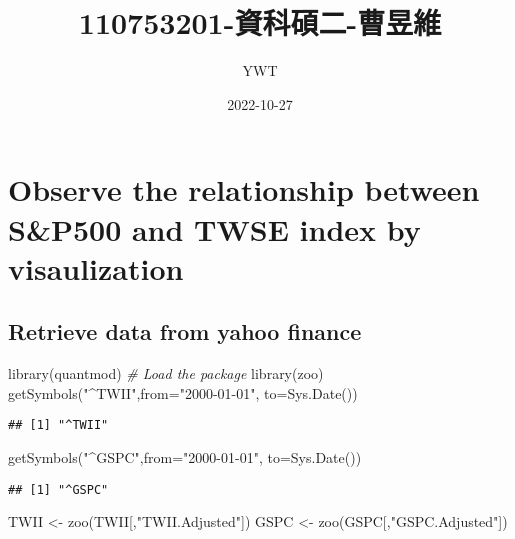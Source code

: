 \documentclass[
]{article}
\title{110753201-資科碩二-曹昱維}
\author{YWT}
\date{2022-10-27}
\newenvironment{Shaded}{\begin{snugshade}}{\end{snugshade}}
\newcommand{\AttributeTok}[1]{\textcolor[rgb]{0.77,0.63,0.00}{#1}}
\newcommand{\CommentTok}[1]{\textcolor[rgb]{0.56,0.35,0.01}{\textit{#1}}}
\newcommand{\FunctionTok}[1]{\textcolor[rgb]{0.00,0.00,0.00}{#1}}
\newcommand{\NormalTok}[1]{#1}
\newcommand{\OtherTok}[1]{\textcolor[rgb]{0.56,0.35,0.01}{#1}}
\newcommand{\StringTok}[1]{\textcolor[rgb]{0.31,0.60,0.02}{#1}}
\begin{document}
\maketitle

{
\setcounter{tocdepth}{2}
\tableofcontents
}
\hypertarget{observe-the-relationship-between-sp500-and-twse-index-by-visaulization}{%
\section{Observe the relationship between S\&P500 and TWSE index by
visaulization}\label{observe-the-relationship-between-sp500-and-twse-index-by-visaulization}}

\hypertarget{retrieve-data-from-yahoo-finance}{%
\subsection{Retrieve data from yahoo
finance}\label{retrieve-data-from-yahoo-finance}}

\begin{Shaded}
\begin{Highlighting}[]
\FunctionTok{library}\NormalTok{(quantmod) }\CommentTok{\# Load the package}
\FunctionTok{library}\NormalTok{(zoo)}
\FunctionTok{getSymbols}\NormalTok{(}\StringTok{"\^{}TWII"}\NormalTok{,}\AttributeTok{from=}\StringTok{"2000{-}01{-}01"}\NormalTok{, }\AttributeTok{to=}\FunctionTok{Sys.Date}\NormalTok{())}
\end{Highlighting}
\end{Shaded}

\begin{verbatim}
## [1] "^TWII"
\end{verbatim}

\begin{Shaded}
\begin{Highlighting}[]
\FunctionTok{getSymbols}\NormalTok{(}\StringTok{"\^{}GSPC"}\NormalTok{,}\AttributeTok{from=}\StringTok{"2000{-}01{-}01"}\NormalTok{, }\AttributeTok{to=}\FunctionTok{Sys.Date}\NormalTok{())}
\end{Highlighting}
\end{Shaded}

\begin{verbatim}
## [1] "^GSPC"
\end{verbatim}

\begin{Shaded}
\begin{Highlighting}[]
\NormalTok{TWII }\OtherTok{\textless{}{-}} \FunctionTok{zoo}\NormalTok{(TWII[,}\StringTok{"TWII.Adjusted"}\NormalTok{])}
\NormalTok{GSPC }\OtherTok{\textless{}{-}} \FunctionTok{zoo}\NormalTok{(GSPC[,}\StringTok{"GSPC.Adjusted"}\NormalTok{])}
\end{Highlighting}
\end{Shaded}
\end{document}
